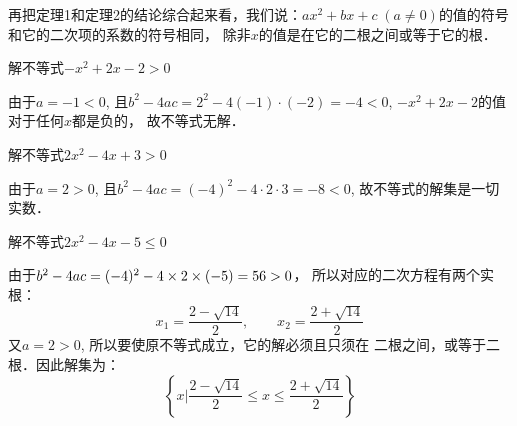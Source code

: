 \begin{center}
\end{center}

再把定理1和定理2的结论综合起来看，我们说：$ax^2+
bx+c\; (a\ne 0)$的值的符号和它的二次项的系数的符号相同，
除非$x$的值是在它的二根之间或等于它的根．



\begin{example}
 解不等式$-x^2+2x-2>0$
\end{example}

\begin{solution}
 由于$a=-1<0$, 且$b^2-4ac=2^2-4(-1)\cdot(-2)=-4<0$, $-x^2+2x-2$的值对于任何$x$都是负的，
故不等式无解．   
\end{solution}

\begin{example}
   解不等式$2x^2-4x+3>0$ 
\end{example}

\begin{solution}
    由于$a=2>0$, 且$b^2-4ac=(-4)^2-4\cdot 2\cdot 3=-8<0$, 故不等式的解集是一切实数．
\end{solution}

\begin{example}
 解不等式$2x^2-4x-5\le 0$   
\end{example}

\begin{solution}
    由于$b^2-4ac=(-4)^2-4\times2\times(-5)=56>0$，
所以对应的二次方程有两个实根：
\[x_1=\frac{2-\sqrt{14}}{2},\qquad x_2=\frac{2+\sqrt{14}}{2}\]
又$a=2>0$, 所以要使原不等式成立，它的解必须且只须在
二根之间，或等于二根．因此解集为：
\[\left\{x\Big|\frac{2-\sqrt{14}}{2}\le x\le \frac{2+\sqrt{14}}{2} \right\}\]
\end{solution}

